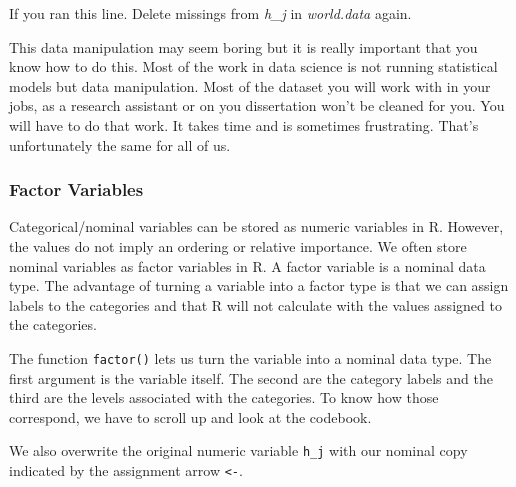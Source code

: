 \documentclass[]{article}
\newenvironment{Shaded}{\begin{snugshade}}{\end{snugshade}}
\newcommand{\KeywordTok}[1]{\textcolor[rgb]{0.13,0.29,0.53}{\textbf{#1}}}
\newcommand{\DataTypeTok}[1]{\textcolor[rgb]{0.13,0.29,0.53}{#1}}
\newcommand{\DecValTok}[1]{\textcolor[rgb]{0.00,0.00,0.81}{#1}}
\newcommand{\StringTok}[1]{\textcolor[rgb]{0.31,0.60,0.02}{#1}}
\newcommand{\CommentTok}[1]{\textcolor[rgb]{0.56,0.35,0.01}{\textit{#1}}}
\newcommand{\OperatorTok}[1]{\textcolor[rgb]{0.81,0.36,0.00}{\textbf{#1}}}
\newcommand{\NormalTok}[1]{#1}
\theoremstyle{definition}
\theoremstyle{definition}
\theoremstyle{definition}
\theoremstyle{remark}
\begin{document}
If you ran this line. Delete missings from \emph{h\_j} in
\emph{world.data} again.

This data manipulation may seem boring but it is really important that
you know how to do this. Most of the work in data science is not running
statistical models but data manipulation. Most of the dataset you will
work with in your jobs, as a research assistant or on you dissertation
won't be cleaned for you. You will have to do that work. It takes time
and is sometimes frustrating. That's unfortunately the same for all of
us.

\subsubsection{Factor Variables}\label{factor-variables}

Categorical/nominal variables can be stored as numeric variables in R.
However, the values do not imply an ordering or relative importance. We
often store nominal variables as factor variables in R. A factor
variable is a nominal data type. The advantage of turning a variable
into a factor type is that we can assign labels to the categories and
that R will not calculate with the values assigned to the categories.

The function \texttt{factor()} lets us turn the variable into a nominal
data type. The first argument is the variable itself. The second are the
category labels and the third are the levels associated with the
categories. To know how those correspond, we have to scroll up and look
at the codebook.

We also overwrite the original numeric variable \texttt{h\_j} with our
nominal copy indicated by the assignment arrow \texttt{\textless{}-}.

\begin{Shaded}
\end{Shaded}
\end{document}
